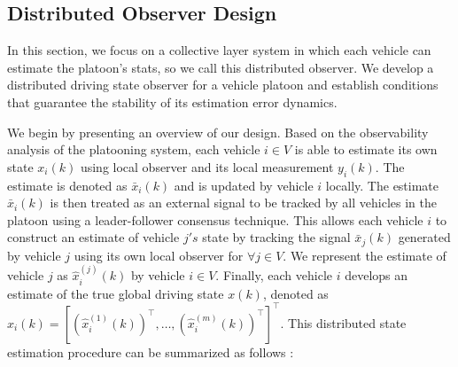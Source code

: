\documentclass[letterpaper, 10pt, conference]{ieeeconf}  %
\begin{document}
\subsection{Distributed Observer Design}
In this section, we focus on a collective layer system in which each vehicle can estimate the platoon's stats, so we call this distributed observer. We develop a distributed driving state observer for a vehicle platoon and establish conditions that guarantee
the stability of its estimation error dynamics.

We begin by presenting an overview of our design. Based
on the observability analysis of the platooning system, each
vehicle $i \in V$ is able to estimate its own state $x_i(k)$ using
local observer and its local measurement $y_i(k)$. The estimate is denoted as $\bar{x}_i(k)$ and is updated by vehicle $i$ 
locally. The estimate $\bar{x}_i(k)$ is then treated as an external signal
to be tracked by all vehicles in the platoon using a leader-follower consensus technique. This allows each vehicle $i$ to
construct an estimate of vehicle $j's$ state by tracking the signal
$\bar{x}_j(k)$ generated by vehicle $j$ using its own local observer for $\forall j \in V$. We represent the estimate of vehicle $j$
as $\hat{x}_i^{(j)}(k)$ by vehicle $i \in V$. Finally, each vehicle $i$ develops
an estimate of the true global driving state $x(k)$, denoted as
$\hat{x}_i(k) = [(\hat{x}_i^{(1)}(k))^\top, \ldots, (\hat{x}_i^{(m)}(k))^\top]^\top$.
This distributed state estimation \cite{Plug_play} procedure can be summarized as follows :
\end{document}
